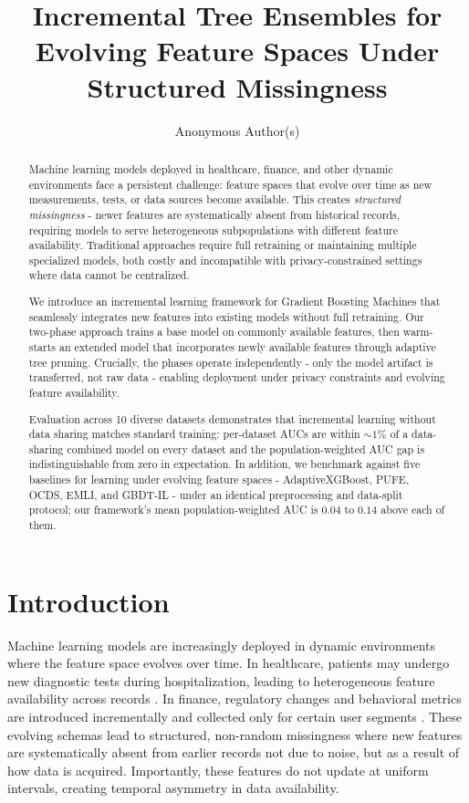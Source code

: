 \documentclass[sigconf]{acmart}
\title{
Incremental Tree Ensembles for Evolving Feature Spaces Under Structured Missingness
}
\author{Anonymous Author(s)}
\affiliation{\institution{Under Double-Blind Review} \country{Unknown}}
\begin{document}
\begin{abstract}
Machine learning models deployed in healthcare, finance, and other dynamic environments face a persistent challenge: feature spaces that evolve over time as new measurements, tests, or data sources become available. This creates \textit{structured missingness} - newer features are systematically absent from historical records, requiring models to serve heterogeneous subpopulations with different feature availability. Traditional approaches require full retraining or maintaining multiple specialized models, both costly and incompatible with privacy-constrained settings where data cannot be centralized.

We introduce an incremental learning framework for Gradient Boosting Machines that seamlessly integrates new features into existing models without full retraining. Our two-phase approach trains a base model on commonly available features, then warm-starts an extended model that incorporates newly available features through adaptive tree pruning. Crucially, the phases operate independently - only the model artifact is transferred, not raw data - enabling deployment under privacy constraints and evolving feature availability.

Evaluation across 10 diverse datasets demonstrates that incremental learning without data sharing matches standard training: per-dataset AUCs are within $\sim 1\%$ of a data-sharing combined model on every dataset and the population-weighted AUC gap is indistinguishable from zero in expectation. In addition, we benchmark against five baselines for learning under evolving feature spaces - AdaptiveXGBoost, PUFE, OCDS, EMLI, and GBDT-IL - under an identical preprocessing and data-split protocol; our framework's mean population-weighted AUC is $0.04$ to $0.14$ above each of them.
\end{abstract}


\maketitle

\section{Introduction}

Machine learning models are increasingly deployed in dynamic environments where the feature space evolves over time. In healthcare, patients may undergo new diagnostic tests during hospitalization, leading to heterogeneous feature availability across records \cite{rajkomar2018healthcare}. In finance, regulatory changes and behavioral metrics are introduced incrementally and collected only for certain user segments \cite{dixon2020finance}. These evolving schemas lead to structured, non-random missingness where new features are systematically absent from earlier records not due to noise, but as a result of how data is acquired. Importantly, these features do not update at uniform intervals, creating temporal asymmetry in data availability.
\end{document}

